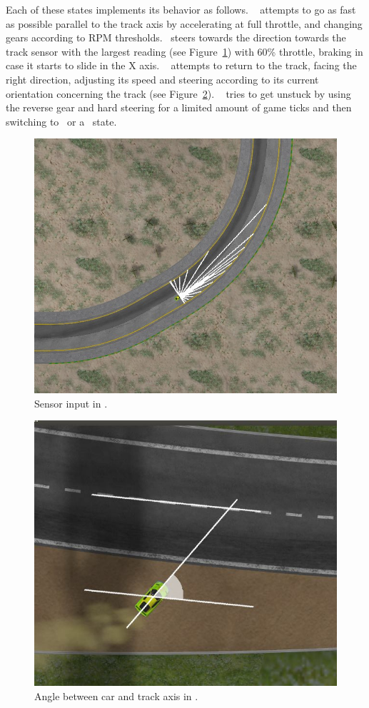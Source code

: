 Each of these states implements its behavior as follows. \SL~ attempts to go as fast as possible parallel to the track axis by accelerating at full throttle, and changing gears according to RPM thresholds. \C~steers towards the direction towards the track sensor with the largest reading (see Figure~\ref{Fig:FSensor}) with 60\% throttle, braking in case it starts to slide in the X axis. \OT~ attempts to return to the track, facing the right direction, adjusting its speed and steering according to its current orientation concerning the track (see Figure~\ref{Fig:Angle}). \St~ tries to get unstuck by using the reverse gear and hard steering for a limited amount of game ticks and then switching to \OT~or a \racing~state.



\begin{figure}[h]
	\centering%
	\includegraphics[width=.45\textwidth]{img/FarthestSensor}
	\caption{Sensor input in \C.}\label{Fig:FSensor}%
\end{figure}

\begin{figure}%
		\centering
		\includegraphics[width=.45\textwidth]{img/ReturnAngle}
		\caption{Angle between car and track axis in \OT.}\label{Fig:Angle}%
\end{figure}

